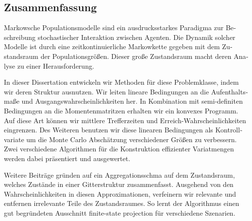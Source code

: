 \begin{otherlanguage}{ngerman}
\chapter*{Zusammenfassung}
Markowsche Populationsmodelle sind ein ausdrucksstarkes Paradigma zur Beschreibung stochastischer Interaktion zwischen Agenten.
Die Dynamik solcher Modelle ist durch eine zeitkontinuierliche Markowkette gegeben mit dem Zustandsraum der Populationsgrößen.
Dieser große Zustandsraum macht deren Analyse zu einer Herausforderung.

In dieser Dissertation entwickeln wir Methoden für diese Problemklasse, indem wir deren Struktur ausnutzen.
Wir leiten lineare Bedingungen an die Aufenthaltsmaße und Ausgangswahrscheinlichkeiten her.
In Kombination mit semi-definiten Bedingungen an die Momentenmatritzen erhalten wir ein konvexes Programm.
Auf diese Art können wir mittlere Trefferzeiten und Erreich-Wahrscheinlichkeiten eingrenzen.
Des Weiteren benutzen wir diese linearen Bedingungen als Kontrollvariate um die Monte Carlo Abschätzung verschiedener Größen zu verbessern.
Zwei verschiedene Algorithmen für die Konstruktion effizienter Variatmengen werden dabei präsentiert und ausgewertet.

Weitere Beiträge gründen auf ein Aggregationsschma auf dem Zustandsraum, welches Zustände in einer Gitterstruktur zusammenfasst.
Ausgehend von den Wahrscheinlichkeiten in diesen Approximationen, verfeinern wir relevante und entfernen irrelevante Teile des Zustandsraumes.
    So lernt der Algorithmus einen gut begründeten Ausschnitt \glqq finite-state projection\grqq{} für verschiedene Szenarien.
\end{otherlanguage}


\vfill
